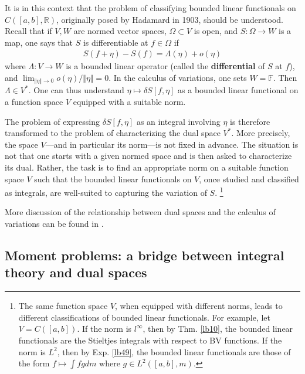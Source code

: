 \documentclass[12pt,b5paper,notitlepage]{article}
\theoremstyle{definition}
\theoremstyle{plain}
\newcommand{\Rbb}{\mathbb R}
\newcommand{\Fbb}{\mathbb F}
\numberwithin{equation}{section}
\begin{document}
It is in this context that the problem of classifying bounded linear functionals on $C([a,b],\Rbb)$, originally posed by Hadamard in 1903, should be understood. Recall that if $V,W$ are normed vector spaces, $\Omega\subset V$ is open, and $S:\Omega\rightarrow W$ is a map, one says that $S$ is differentiable at $f\in\Omega$ if 
\begin{align*}
S(f+\eta)-S(f)=\Lambda(\eta)+o(\eta)
\end{align*}
where $\Lambda:V\rightarrow W$ is a bounded linear operator (called the \textbf{differential} of $S$ at $f$), and $\lim_{\Vert\eta\Vert\rightarrow0}o(\eta)/\Vert\eta\Vert=0$. In the calculus of variations, one sets $W=\Fbb$. Then $\Lambda\in V^*$. One can thus understand $\eta\mapsto\delta S[f,\eta]$ as a bounded linear functional on a function space $V$ equipped with a suitable norm.



The problem of expressing $\delta S[f,\eta]$ as an integral involving $\eta$ is therefore transformed to the problem of characterizing the dual space $V^*$. More precisely, the space $V$---and in particular its norm---is not fixed in advance. The situation is not that one starts with a given normed space and is then asked to characterize its dual. Rather, the task is to find an appropriate norm on a suitable function space $V$ such that the bounded linear functionals on $V$, once studied and classified as integrals, are well-suited to capturing the variation of $S$. \footnote{The same function space $V$, when equipped with different norms, leads to different classifications of bounded linear functionals. For example, let $V=C([a,b])$. If the norm is $l^\infty$, then by Thm. \ref{lb10}, the bounded linear functionals are the Stieltjes integrals with respect to BV functions. If the norm is $L^2$, then by Exp. \ref{lb49}, the bounded linear functionals are those of the form $f\mapsto\int fgdm$ where $g\in L^2([a,b],m)$.} 

More discussion of the relationship between dual spaces and the calculus of variations can be found in \cite{Gray84}.





\subsection{Moment problems: a bridge between integral theory and dual spaces}\label{lb41}
\end{document}
